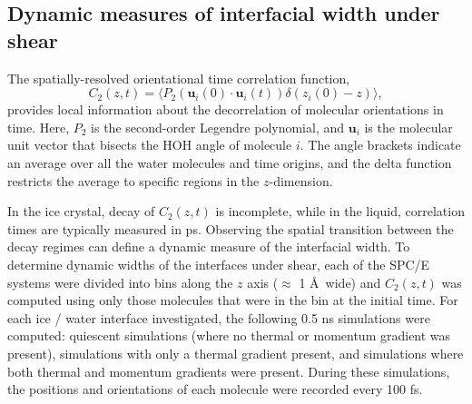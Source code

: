 \subsection{Dynamic measures of interfacial width under shear}
The spatially-resolved orientational time correlation function,
\begin{equation}\label{C(t)1}
  C_{2}(z,t)=\langle P_{2}(\mathbf{u}_i(0)\cdot \mathbf{u}_i(t))
  \delta(z_i(0) - z) \rangle,
\end{equation}
provides local information about the decorrelation of molecular
orientations in time. Here, $P_{2}$ is the second-order Legendre
polynomial, and $\mathbf{u}_i$ is the molecular unit vector that bisects
the HOH angle of molecule $i$. The angle brackets indicate an average
over all the water molecules and time origins, and the delta function
restricts the average to specific regions in the $z$-dimension. 

In the ice crystal, decay of $C_2(z,t)$ is incomplete, while in the
liquid, correlation times are typically measured in ps. Observing the
spatial transition between the decay regimes can define a dynamic
measure of the interfacial width. To determine dynamic widths of the
interfaces under shear, each of the SPC/E systems were divided into
bins along the $z$ axis ($\approx$ 1 \AA\ wide) and $C_2(z,t)$ was
computed using only those molecules that were in the bin at the
initial time. For each ice / water interface investigated, the
following 0.5 ns simulations were computed: quiescent simulations
(where no thermal or momentum gradient was present), simulations with
only a thermal gradient present, and simulations where both thermal
and momentum gradients were present. During these simulations, the
positions and orientations of each molecule were recorded every 100
fs.

